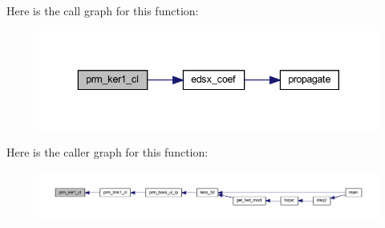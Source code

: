 Here is the call graph for this function\+:\nopagebreak
\begin{figure}[H]
\begin{center}
\leavevmode
\includegraphics[width=343pt]{Leroi_8f90_a2ff2214d55840301662aae090b26e04d_cgraph}
\end{center}
\end{figure}
Here is the caller graph for this function\+:\nopagebreak
\begin{figure}[H]
\begin{center}
\leavevmode
\includegraphics[width=350pt]{Leroi_8f90_a2ff2214d55840301662aae090b26e04d_icgraph}
\end{center}
\end{figure}
\mbox{\label{Leroi_8f90_a3a9566c86f1c0b93bae5a6117621feae}} 

